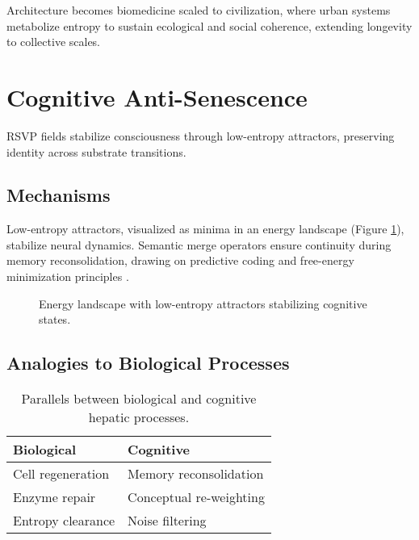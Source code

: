 \documentclass[12pt]{article}
\begin{document}
Architecture becomes biomedicine scaled to civilization, where urban systems metabolize entropy to sustain ecological and social coherence, extending longevity to collective scales.

\section{Cognitive Anti-Senescence}
\label{sec:cognitive_anti_senescence}

RSVP fields stabilize consciousness through low-entropy attractors, preserving identity across substrate transitions.

\subsection{Mechanisms}
\label{subsec:cognitive_mechanisms}

Low-entropy attractors, visualized as minima in an energy landscape (Figure \ref{fig:energy_landscape}), stabilize neural dynamics. Semantic merge operators ensure continuity during memory reconsolidation, drawing on predictive coding and free-energy minimization principles \cite{friston2010}.

\begin{figure}[h]
\centering
{}
\caption{Energy landscape with low-entropy attractors stabilizing cognitive states.}
\label{fig:energy_landscape}
\end{figure}

\subsection{Analogies to Biological Processes}
\label{subsec:cognitive_analogies}

\begin{table}[h]
\centering
\begin{tabular}{ll}
\toprule
\textbf{Biological} & \textbf{Cognitive} \\
\midrule
Cell regeneration & Memory reconsolidation \\
Enzyme repair & Conceptual re-weighting \\
Entropy clearance & Noise filtering \\
\bottomrule
\end{tabular}
\caption{Parallels between biological and cognitive hepatic processes.}
\label{tab:analogies}
\end{table}
\end{document}
